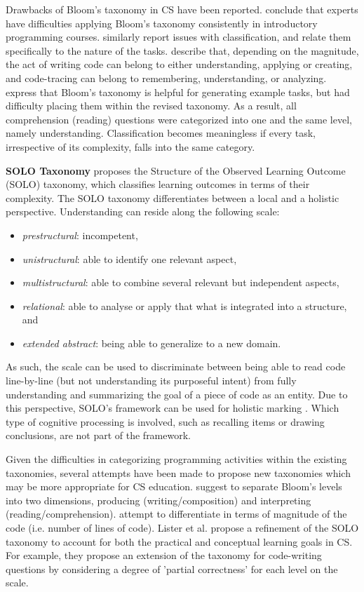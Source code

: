 Drawbacks of Bloom's taxonomy in CS have been reported.  conclude that experts have difficulties applying Bloom's taxonomy consistently in introductory programming courses.  similarly report issues with classification, and relate them specifically to the nature of the tasks.  describe that, depending on the magnitude, the act of writing code can belong to either understanding, applying or creating, and code-tracing can belong to remembering, understanding, or  analyzing.  express that Bloom's taxonomy is helpful for generating example tasks, but had difficulty placing them within the revised taxonomy. As a result, all comprehension (reading) questions were categorized into one and the same level, namely understanding. Classification becomes meaningless if every task, irrespective of its complexity, falls into the same category.


\noindent \textbf{SOLO Taxonomy}\newline
{} proposes the Structure of the Observed Learning Outcome (SOLO) taxonomy, which classifies learning outcomes in terms of their complexity. The SOLO taxonomy differentiates between a local and a holistic perspective. Understanding can reside along the following scale:
\begin{itemize}
\item \emph{prestructural}: incompetent,
\item \emph{unistructural}: able to identify one relevant aspect,
\item \emph{multistructural}: able to combine several relevant but independent aspects,
\item \emph{relational}: able to analyse or apply that what is integrated into a structure, and
\item \emph{extended abstract}: being able to generalize to a new domain.
\end{itemize}
 As such, the scale can be used to discriminate between being able to read code line-by-line (but not understanding its purposeful intent) from fully understanding and summarizing the goal of a piece of code as an entity. Due to this perspective, SOLO's framework can be used for holistic marking \cite{Fuller2007}. Which type of cognitive processing is involved, such as recalling items or drawing conclusions, are not part of the framework.


Given the difficulties in categorizing programming activities within the existing taxonomies, several attempts have been made to propose new taxonomies which may be more appropriate for CS education.  suggest to separate Bloom’s levels into two dimensions, producing (writing/composition) and interpreting (reading/comprehension).  attempt to differentiate in terms of magnitude of the code (i.e. number of lines of code). Lister et al. \cite{lister2010naturally} propose a refinement of the SOLO taxonomy to account for both the practical and conceptual learning goals in CS. For example, they propose an extension of the taxonomy for code-writing questions by considering a degree of 'partial correctness' for each level on the scale.

